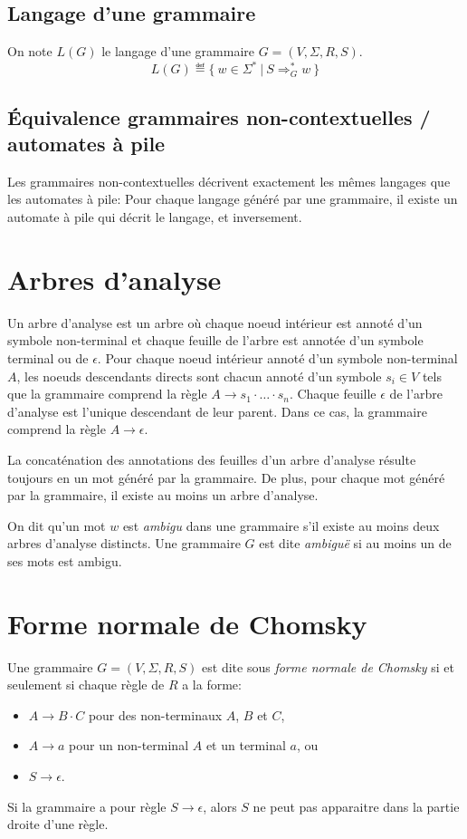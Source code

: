 \subsection{Langage d'une grammaire}

On note $L(G)$ le langage d'une grammaire $G = (V, \Sigma, R, S)$.
\[
L(G) \eqdef \{\ w \in \Sigma^*\ |\ S \Rightarrow_G^* w\ \}
\]

\subsection{Équivalence grammaires non-contextuelles / automates à pile}

Les grammaires non-contextuelles décrivent exactement les mêmes langages que les automates à pile:
Pour chaque langage généré par une grammaire, il existe un automate à pile qui décrit le langage, et inversement.

\section{Arbres d'analyse}

Un arbre d'analyse est un arbre où chaque noeud intérieur est annoté d'un symbole non-terminal et chaque feuille de l'arbre est annotée d'un symbole terminal ou de $\epsilon$.
Pour chaque noeud intérieur annoté d'un symbole non-terminal $A$, les noeuds descendants directs sont chacun annoté d'un symbole $s_i \in V$ tels que la grammaire comprend la règle $A \to s_1 \cdot \ldots \cdot s_n$.
Chaque feuille $\epsilon$ de l'arbre d'analyse est l'unique descendant de leur parent. Dans ce cas, la grammaire comprend la règle $A \to \epsilon$.

La concaténation des annotations des feuilles d'un arbre d'analyse résulte toujours en un mot généré par la grammaire.
De plus, pour chaque mot généré par la grammaire, il existe au moins un arbre d'analyse.

On dit qu'un mot $w$ est \og \textit{ambigu} \fg{} dans une grammaire s'il existe au moins deux arbres d'analyse distincts.
Une grammaire $G$ est dite \og \textit{ambiguë} \fg{} si au moins un de ses mots est ambigu.

\section{Forme normale de Chomsky}

Une grammaire $G = (V, \Sigma, R, S)$ est dite sous \og \textit{forme normale de Chomsky} \fg{} si et seulement si chaque règle de $R$ a la forme:
\begin{itemize}
\item $A \to B \cdot C$ pour des non-terminaux $A$, $B$ et $C$,
\item $A \to a$ pour un non-terminal $A$ et un terminal $a$, ou
\item $S \to \epsilon$.
\end{itemize}
Si la grammaire a pour règle $S \to \epsilon$, alors $S$ ne peut pas apparaitre dans la partie droite d'une règle.

